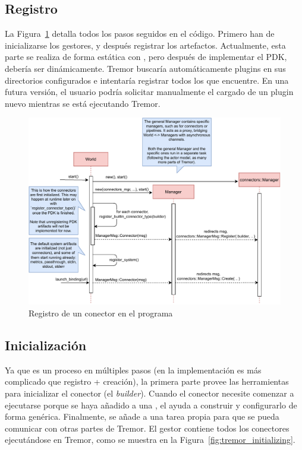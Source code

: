 \subsection{Registro}

La Figura~\ref{fig:tremor_registering} detalla todos los pasos seguidos en el
código. Primero han de inicializarse los gestores, y después registrar los
artefactos. Actualmente, esta parte se realiza de forma estática con
, pero después de implementar el PDK, debería ser
dinámicamente. Tremor buscaría automáticamente plugins en sus directorios
configurados e intentaría registrar todos los que encuentre. En una futura
versión, el usuario podría solicitar manualmente el cargado de un plugin nuevo
mientras se está ejecutando Tremor.

\begin{figure}
    \centering
    \includegraphics[width=\textwidth]{./Imagenes/registering.pdf}
    \caption{Registro de un conector en el programa}%
    \label{fig:tremor_registering}
\end{figure}

\subsection{Inicialización}

Ya que es un proceso en múltiples pasos (en la implementación es más complicado
que registro + creación), la primera parte provee las herramientas para
inicializar el conector (el \emph{builder}). Cuando el conector necesite
comenzar a ejecutarse porque se haya añadido a una \pipeline, el \builder ayuda
a construir y configurarlo de forma genérica. Finalmente, se añade a una tarea
propia para que se pueda comunicar con otras partes de Tremor. El gestor
 contiene todos los conectores ejecutándose en Tremor,
como se muestra en la Figura~\ref{fig:tremor_initializing}.


